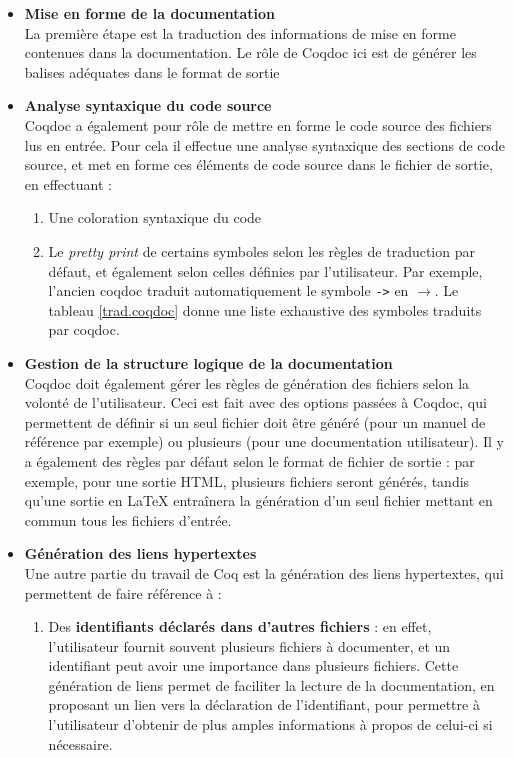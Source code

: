 \documentclass[a4paper, 11pt]{report}
\begin{document}
    \begin{itemize}
      \item \textbf{Mise en forme de la documentation} \\
        La première étape est la traduction des informations de mise en forme
        contenues dans la documentation. Le rôle de Coqdoc ici est de générer
        les balises adéquates dans le format de sortie
      \item \textbf{Analyse syntaxique du code source} \\
        Coqdoc a également pour rôle de mettre en forme le code source des
        fichiers lus en entrée. Pour cela il effectue une analyse syntaxique
        des sections de code source, et met en forme ces éléments de code
        source dans le fichier de sortie, en effectuant :
        \begin{enumerate}
          \item Une coloration syntaxique du code
          \item Le \textit{pretty print} de certains symboles selon les règles
            de traduction par défaut, et également selon celles définies
            par l'utilisateur. Par exemple, l'ancien coqdoc traduit
            automatiquement le symbole \texttt{->} en \texttt{$\rightarrow$}.
            Le tableau \cref{trad.coqdoc} donne une liste exhaustive des
            symboles traduits par coqdoc.
        \end{enumerate}
      \item \textbf{Gestion de la structure logique de la documentation} \\
        Coqdoc doit également gérer les règles de génération des fichiers selon
        la volonté de l'utilisateur. Ceci est fait avec des options passées à
        Coqdoc, qui permettent de définir si un seul fichier doit être généré
        (pour un manuel de référence par exemple) ou plusieurs
        (pour une documentation utilisateur). Il y a également des règles par
        défaut selon le format de fichier de sortie : par exemple, pour une
        sortie HTML, plusieurs fichiers seront générés, tandis qu'une sortie
        en LaTeX entraînera la génération d'un seul fichier mettant en commun
        tous les fichiers d'entrée.
      \item \textbf{Génération des liens hypertextes} \\
        Une autre partie du travail de Coq est la génération des liens
        hypertextes, qui permettent de faire référence à :
        \begin{enumerate}
          \item Des \textbf{identifiants déclarés dans d'autres fichiers} : en
            effet,
            l'utilisateur fournit souvent plusieurs fichiers à documenter, et
            un identifiant peut avoir une importance dans plusieurs fichiers.
            Cette génération de liens permet de faciliter la lecture de la
            documentation, en proposant un lien vers la déclaration de
            l'identifiant, pour permettre à l'utilisateur d'obtenir de plus
            amples informations à propos de celui-ci si nécessaire.


\end{enumerate}
\end{itemize}
\end{document}
